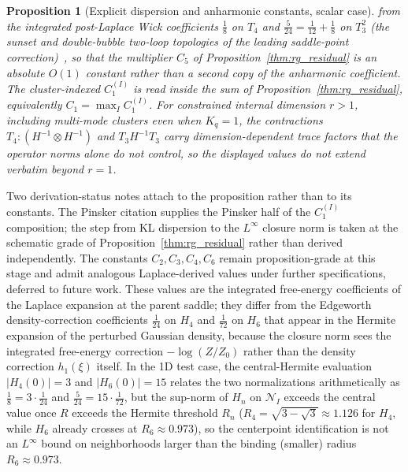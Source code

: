 \documentclass[11pt]{article}
\newtheorem{proposition}{Proposition}
\begin{document}
\begin{proposition}[Explicit dispersion and anharmonic constants, scalar case]
from the integrated post-Laplace Wick coefficients $\tfrac{1}{8}$ on $T_4$ and $\tfrac{5}{24} = \tfrac{1}{12} + \tfrac{1}{8}$ on $T_3^2$ (the sunset and double-bubble two-loop topologies of the leading saddle-point correction)~\cite{BenderOrszag1999, wong2001asymptotic}, so that the multiplier $C_5$ of Proposition~\ref{thm:rg_residual} is an absolute $O(1)$ constant rather than a second copy of the anharmonic coefficient. The cluster-indexed $C_1^{(I)}$ is read inside the sum of Proposition~\ref{thm:rg_residual}, equivalently $C_1 = \max_I C_1^{(I)}$. For constrained internal dimension $r>1$, including multi-mode clusters even when $K_q=1$, the contractions $T_4 \mathbin{:} (H^{-1} \otimes H^{-1})$ and $T_3 H^{-1} T_3$ carry dimension-dependent trace factors that the operator norms alone do not control, so the displayed values do not extend verbatim beyond $r=1$.
\end{proposition}

Two derivation-status notes attach to the proposition rather than to its constants. The Pinsker citation supplies the Pinsker half of the $C_1^{(I)}$ composition; the step from KL dispersion to the $L^\infty$ closure norm is taken at the schematic grade of Proposition~\ref{thm:rg_residual} rather than derived independently. The constants $C_2, C_3, C_4, C_6$ remain proposition-grade at this stage and admit analogous Laplace-derived values under further specifications, deferred to future work. These values are the integrated free-energy coefficients of the Laplace expansion at the parent saddle; they differ from the Edgeworth density-correction coefficients $\tfrac{1}{24}$ on $H_4$ and $\tfrac{1}{72}$ on $H_6$ that appear in the Hermite expansion of the perturbed Gaussian density, because the closure norm sees the integrated free-energy correction $-\log(Z/Z_0)$ rather than the density correction $h_1(\xi)$ itself. In the 1D test case, the central-Hermite evaluation $|H_4(0)| = 3$ and $|H_6(0)| = 15$ relates the two normalizations arithmetically as $\tfrac{1}{8} = 3 \cdot \tfrac{1}{24}$ and $\tfrac{5}{24} = 15 \cdot \tfrac{1}{72}$, but the sup-norm of $H_n$ on $\mathcal{N}_I$ exceeds the central value once $R$ exceeds the Hermite threshold $R_n$ ($R_4 = \sqrt{3-\sqrt{3}} \approx 1.126$ for $H_4$, while $H_6$ already crosses at $R_6 \approx 0.973$), so the centerpoint identification is not an $L^\infty$ bound on neighborhoods larger than the binding (smaller) radius $R_6 \approx 0.973$.
\end{document}
